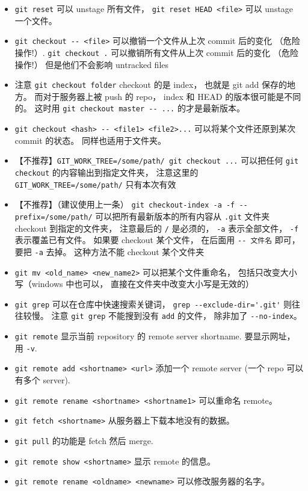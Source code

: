 \begin{itemize}
\item \verb|git reset| 可以 unstage 所有文件， \verb|git reset HEAD <file>| 可以 unstage 一个文件。
\item \verb|git checkout -- <file>| 可以撤销一个文件从上次 commit 后的变化 （危险操作!）. \verb|git checkout .| 可以撤销所有文件从上次 commit 后的变化 （危险操作!） 但是他们不会影响 untracked files
\item 注意 \verb|git checkout folder| checkout 的是 index， 也就是 git add 保存的地方。 而对于服务器上被 push 的 repo， index 和 HEAD 的版本很可能是不同的。 这时用 \verb|git checkout master -- ...| 的才是最新版本。
\item \verb|git checkout <hash> -- <file1> <file2>...| 可以将某个文件还原到某次 commit 的状态。 同样也适用于文件夹。
\item 【不推荐】\verb|GIT_WORK_TREE=/some/path/ git checkout ...| 可以把任何 \verb|git checkout| 的内容输出到指定文件夹， 注意这里的 \verb|GIT_WORK_TREE=/some/path/| 只有本次有效
\item 【不推荐】（建议使用上一条） \verb|git checkout-index -a -f --prefix=/some/path/| 可以把所有最新版本的所有内容从 \verb|.git| 文件夹 checkout 到指定的文件夹， 注意最后的 \verb|/| 是必须的， \verb|-a| 表示全部文件， \verb|-f| 表示覆盖已有文件。 如果要 checkout 某个文件， 在后面用 \verb|-- 文件名| 即可， 要把 \verb|-a| 去掉。 这种方法不能 checkout 某个文件夹
\item \verb|git mv <old_name> <new_name2>| 可以把某个文件重命名， 包括只改变大小写（windows 中也可以， 直接在文件夹中改变大小写是无效的）
\item \verb|git grep| 可以在仓库中快速搜索关键词， \verb|grep --exclude-dir='.git'| 则往往较慢。 注意 \verb|git grep| 不能搜到没有 \verb|add| 的文件， 除非加了 \verb|--no-index|。
\item \verb|git remote| 显示当前 repository 的 remote server shortname. 要显示网址， 用 \verb|-v|.
\item \verb|git remote add <shortname> <url>| 添加一个 remote server (一个 repo 可以有多个 server).
\item \verb|git remote rename <shortname> <shortname1>| 可以重命名 remote。
\item \verb|git fetch <shortname>| 从服务器上下载本地没有的数据。
\item \verb|git pull| 的功能是 fetch 然后 merge.
\item \verb|git remote show <shortname>| 显示 remote 的信息。
\item \verb|git remote rename <oldname> <newname>| 可以修改服务器的名字。

\end{itemize}
